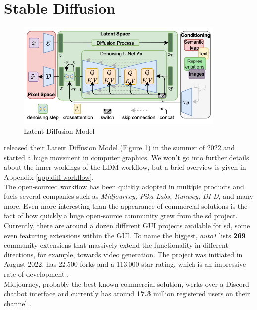 \documentclass[
  a4paper,  %
  twoside,  %
  bibliography=totoc,
  headsepline,
  cleardoublepage=empty,
  parskip=half,
  draft=false
]{scrbook}
\begin{document}
\section{Stable Diffusion}
\label{sec:stable-diffusion-bg}
\begin{figure}[h]
  \centering
  \includegraphics[width=0.9\textwidth]{./graphics/images/latent-diffusion.png}
  \caption{Latent Diffusion Model \cite{rombachHighResolutionImageSynthesis2022}}
  \label{fig:ldm-arch}
\end{figure}
\citet{rombachHighResolutionImageSynthesis2022} released their Latent Diffusion Model (Figure \ref{fig:ldm-arch}) in the summer of 2022 and started a huge movement in computer graphics. We won't go into further details about the inner workings of the LDM workflow, but a brief overview is given in Appendix \ref{app:diff-workflow}.\\
The open-sourced workflow has been quickly adopted in multiple products and fuels several companies such as \textit{Midjourney, Pika-Labs, Runway, DI-D}, and many more. Even more interesting than the appearance of commercial solutions is the fact of how quickly a huge open-source community grew from the \gls{sd} project. Currently, there are around a dozen different GUI projects available for \gls{sd}, some even featuring extensions within the GUI. To name the biggest, \textit{\gls{auto1}} lists \textbf{269} community extensions that massively extend the functionality in different directions, for example, towards video generation. The project was initiated in August 2022, has 22.500 forks and a 113.000 star rating, which is an impressive rate of development \cite{AUTOMATIC1111StablediffusionwebuiStable}. \\
Midjourney, probably the best-known commercial solution, works over a Discord chatbot interface and currently has around \textbf{17.3} million registered users on their channel \cite{midjourneyJoinMidjourneyDiscord}. \\
\end{document}
